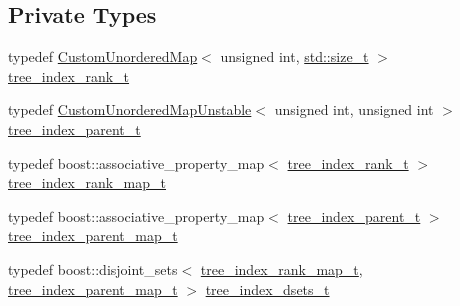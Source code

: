\subsection*{Private Types}
\begin{DoxyCompactItemize}
\item 
typedef \hyperlink{custom__map_8hpp_ad1ed68f2ff093683ab1a33522b144adc}{Custom\+Unordered\+Map}$<$ unsigned int, \hyperlink{tutorial__pact__2019_2Introduction_2sixth_2test_8c_a7c94ea6f8948649f8d181ae55911eeaf}{std\+::size\+\_\+t} $>$ \hyperlink{classmodule__register__binding__spec_a151eec9e0ca85fdf97be1090bf8d46ad}{tree\+\_\+index\+\_\+rank\+\_\+t}
\item 
typedef \hyperlink{custom__map_8hpp_a8cbaceffc09790a885ec7e9c17809c69}{Custom\+Unordered\+Map\+Unstable}$<$ unsigned int, unsigned int $>$ \hyperlink{classmodule__register__binding__spec_a7caa9258582c53bbbb84194770abe960}{tree\+\_\+index\+\_\+parent\+\_\+t}
\item 
typedef boost\+::associative\+\_\+property\+\_\+map$<$ \hyperlink{classmodule__register__binding__spec_a151eec9e0ca85fdf97be1090bf8d46ad}{tree\+\_\+index\+\_\+rank\+\_\+t} $>$ \hyperlink{classmodule__register__binding__spec_a8336f338b308445a062ca2f293617f67}{tree\+\_\+index\+\_\+rank\+\_\+map\+\_\+t}
\item 
typedef boost\+::associative\+\_\+property\+\_\+map$<$ \hyperlink{classmodule__register__binding__spec_a7caa9258582c53bbbb84194770abe960}{tree\+\_\+index\+\_\+parent\+\_\+t} $>$ \hyperlink{classmodule__register__binding__spec_a5d303749648df3668e9ccf7c368660cb}{tree\+\_\+index\+\_\+parent\+\_\+map\+\_\+t}
\item 
typedef boost\+::disjoint\+\_\+sets$<$ \hyperlink{classmodule__register__binding__spec_a8336f338b308445a062ca2f293617f67}{tree\+\_\+index\+\_\+rank\+\_\+map\+\_\+t}, \hyperlink{classmodule__register__binding__spec_a5d303749648df3668e9ccf7c368660cb}{tree\+\_\+index\+\_\+parent\+\_\+map\+\_\+t} $>$ \hyperlink{classmodule__register__binding__spec_a26171ae8c88c4fe1a5397cdd47d417e3}{tree\+\_\+index\+\_\+dsets\+\_\+t}
\end{DoxyCompactItemize}
